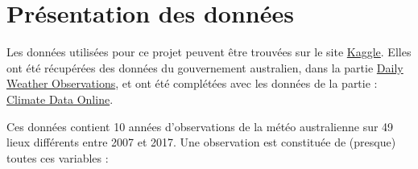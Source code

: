 \documentclass{article}
\begin{document}
\section{Présentation des données}

Les données utilisées pour ce projet peuvent être trouvées sur le site \href{https://www.kaggle.com/jsphyg/weather-dataset-rattle-package}{Kaggle}. Elles ont été récupérées des données du gouvernement australien, dans la partie \href{http://www.bom.gov.au/climate/dwo}{Daily Weather Observations}, et ont été complétées avec les données de la partie :  \href{http://www.bom.gov.au/climate/data}{Climate Data Online}.

Ces données contient 10 années d'observations de la météo australienne sur 49 lieux différents entre 2007 et 2017. Une observation est constituée de (presque) toutes ces variables : 
\end{document}
